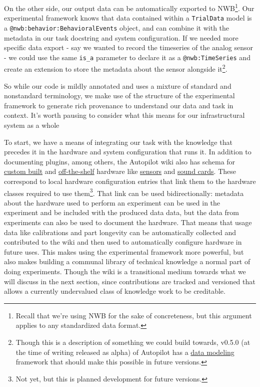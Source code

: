 On the other side, our output data can be automatically exported to
NWB\footnote{Recall that we're using NWB for the sake of concreteness,
  but this argument applies to any standardized data format.}. Our
experimental framework knows that data contained within a
\texttt{TrialData} model is a \texttt{@nwb:behavior:BehavioralEvents}
object, and can combine it with the metadata in our task docstring and
system configuration. If we needed more specific data export - say we
wanted to record the timeseries of the analog sensor - we could use the
same \texttt{is\_a} parameter to declare it as a
\texttt{@nwb:TimeSeries} and create an extension to store the metadata
about the sensor alongside it\footnote{Though this is a description of
  something we could build towards, v0.5.0 (at the time of writing
  released as alpha) of Autopilot has a
  \href{https://docs.auto-pi-lot.com/en/latest/changelog/v0.5.0.html}{data
  modeling} framework that should make this possible in future versions.}.

So while our code is mildly annotated and uses a mixture of standard and
nonstandard terminology, we make use of the structure of the
experimental framework to generate rich provenance to understand our
data and task in context. It's worth pausing to consider what this means
for our infrastructural system as a whole

To start, we have a means of integrating our task with the knowledge
that precedes it in the hardware and system configuration that runs it.
In addition to documenting plugins, among others, the Autopilot wiki
also has schema for
\href{https://wiki.auto-pi-lot.com/index.php/Autopilot_Behavior_Box}{custom
built} and
\href{https://wiki.auto-pi-lot.com/index.php/Parts}{off-the-shelf}
hardware like
\href{https://wiki.auto-pi-lot.com/index.php/TT_Electronics_OPB901L55}{sensors}
and \href{https://wiki.auto-pi-lot.com/index.php/HiFiBerry_Amp2}{sound
cards}. These correspond to local hardware configuration entries that
link them to the hardware classes required to use them\footnote{Not yet,
  but this is planned development for future versions.}. That link can
be used bidirectionally: metadata about the hardware used to perform an
experiment can be used in the experiment and be included with the
produced data data, but the data from experiments can also be used to
document the hardware. That means that usage data like calibrations and
part longevity can be automatically collected and contributed to the
wiki and then used to automatically configure hardware in future uses.
This makes using the experimental framework more powerful, but also
makes building a communal library of technical knowledge a normal part
of doing experiments. Though the wiki is a transitional medium towards
what we will discuss in the next section, since contributions are
tracked and versioned that allows a currently undervalued class of
knowledge work to be creditable.

